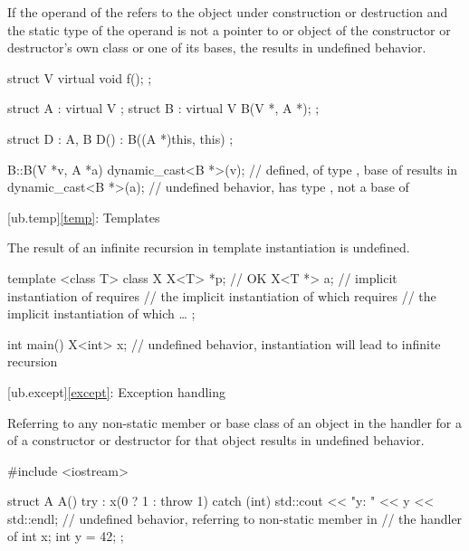 
\pnum
If the operand of the 
refers to the object under construction or destruction
and the static type of the operand
is not a pointer to or object of
the constructor or destructor's own class or one of its bases,
the  results in undefined behavior.

\pnum
\begin{example}
\begin{codeblock}
struct V {
  virtual void f();
};

struct A : virtual V {};
struct B : virtual V {
  B(V *, A *);
};

struct D : A, B {
  D() : B((A *)this, this) {}
};

B::B(V *v, A *a) {
  dynamic_cast<B *>(v);         // defined,  of type ,  base of  results in 
  dynamic_cast<B *>(a);         // undefined behavior,  has type ,  not a base of 
}
\end{codeblock}
\end{example}

[ub.temp]{\ref*{temp}: Templates}


\pnum
The result of an infinite recursion in template instantiation is undefined.

\pnum
\begin{example}
\begin{codeblock}
template <class T>
class X {
  X<T> *p;      // OK
  X<T *> a;     // implicit instantiation of  requires
                // the implicit instantiation of  which requires
                // the implicit instantiation of  which \ldots
};

int main() {
  X<int> x;     // undefined behavior, instantiation will lead to infinite recursion
}
\end{codeblock}
\end{example}

[ub.except]{\ref*{except}: Exception handling}


\pnum
Referring to any non-static member or base class of an object
in the handler for a 
of a constructor or destructor for that object
results in undefined behavior.

\pnum
\begin{example}
\begin{codeblock}
#include <iostream>

struct A {
  A() try : x(0 ? 1 : throw 1) {
  } catch (int) {
    std::cout << "y: " << y << std::endl;   // undefined behavior, referring to non-static member  in
                                            // the handler of 
  }
  int x;
  int y = 42;
};
\end{codeblock}
\end{example}
